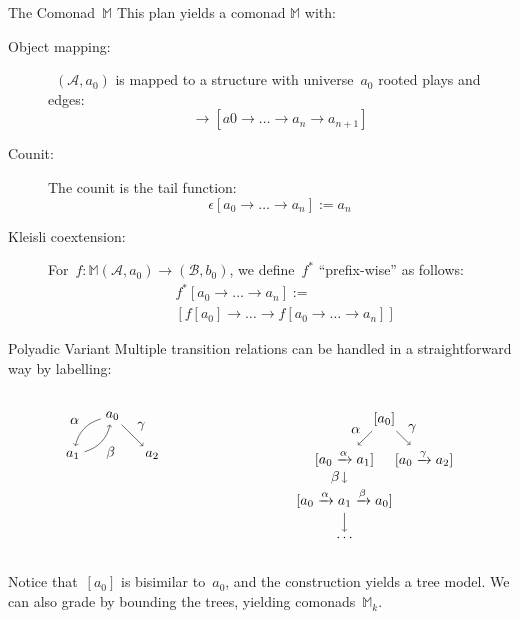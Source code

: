 \documentclass{beamer}
\newcommand{\As}{\mathcal{A}}
\newcommand{\Bs}{\mathcal{B}}
\newcommand{\M}{\mathbb{M}}
\newcommand{\Mk}{\M_{k}}
\newcommand{\aplayn}[1]{[a_0 \rightarrow \ldots \rightarrow a_{#1}]}
\newcommand{\aplay}{\aplayn{n}}
\begin{document}
\begin{frame}{The Comonad~$\M$}
    This plan yields a comonad $\M$ with:
    \begin{description}
    \item[Object mapping:]~$(\As,a_0)$ is mapped to a structure with universe~$a_0$ rooted plays and edges:
    \begin{equation*}
        \aplay \rightarrow [a0 \rightarrow \ldots \rightarrow a_n \rightarrow a_{n + 1}]
    \end{equation*}
    \item[Counit:] The counit is the tail function:
    \begin{equation*}
        \epsilon\aplay := a_n
    \end{equation*}
    \item[Kleisli coextension:] For~$f : \M (\As,a_0) \rightarrow (\Bs, b_0)$, we define~$f^*$ ``prefix-wise'' as follows:
    \begin{align*}
        &f^*\aplay :=\\ 
        &[f[a_0] \rightarrow \ldots \rightarrow f\aplay]
    \end{align*}
    \end{description}
\end{frame}

\begin{frame}{Polyadic Variant}
Multiple transition relations can be handled in a straightforward way by labelling:
\begin{columns}
\begin{column}{0.5\textwidth}
\begin{equation*}
    \begin{tikzpicture}
        \path node(a0) {$a_0$} +(-1,-1) node (a1) {$a_1$} +(1,-1) node(a2) {$a_2$};
        \path[->] 
        (a0) edge[bend right] node[midway, above left]{$\alpha$} (a1)
        (a1) edge[bend right] node[midway, below right]{$\beta$} (a0)
        (a0) edge node[midway, above right]{$\gamma$} (a2);
        \end{tikzpicture}
    \end{equation*}
\end{column}
\begin{column}{0.5\textwidth}
\begin{equation*}
    \begin{tikzpicture}
    \path 
    node (a) {$[a_0]$} +(-1,-1) 
    node (b) {$[a_0 \xrightarrow{\alpha} a_1]$} ++(1,-1)
    node (c) {$[a_0 \xrightarrow{\gamma} a_2]$} (b) ++(0,-1)
    node (a') {$[a_0 \xrightarrow{\alpha} a_1 \xrightarrow{\beta} a_0]$} ++(0,-1)
    node (dots) {$\ldots$};
    \path[->]
    (a) edge node[midway, above left]{$\alpha$} (b)
    (a) edge node[midway, above right]{$\gamma$} (c)
    (b) edge node[midway, left]{$\beta$} (a')
    (a') edge (dots);
    \end{tikzpicture}
\end{equation*}
\end{column}
\end{columns}
Notice that~$[a_0]$ is bisimilar to~$a_0$, and the construction yields a tree model. We can also grade by bounding the trees, yielding comonads~$\Mk$.
\end{frame}
\end{document}
